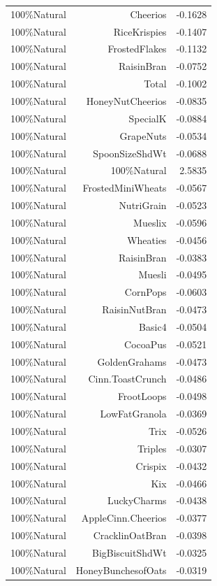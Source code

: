 \begin{longtable}{@{}lrr@{}}
100\%Natural & Cheerios & -0.1628 \\
100\%Natural & RiceKrispies & -0.1407 \\
100\%Natural & FrostedFlakes & -0.1132 \\
100\%Natural & RaisinBran & -0.0752 \\
100\%Natural & Total & -0.1002 \\
100\%Natural & HoneyNutCheerios & -0.0835 \\
100\%Natural & SpecialK & -0.0884 \\
100\%Natural & GrapeNuts & -0.0534 \\
100\%Natural & SpoonSizeShdWt & -0.0688 \\
100\%Natural & 100\%Natural & 2.5835 \\
100\%Natural & FrostedMiniWheats & -0.0567 \\
100\%Natural & NutriGrain & -0.0523 \\
100\%Natural & Mueslix & -0.0596 \\
100\%Natural & Wheaties & -0.0456 \\
100\%Natural & RaisinBran & -0.0383 \\
100\%Natural & Muesli & -0.0495 \\
100\%Natural & CornPops & -0.0603 \\
100\%Natural & RaisinNutBran & -0.0473 \\
100\%Natural & Basic4 & -0.0504 \\
100\%Natural & CocoaPus & -0.0521 \\
100\%Natural & GoldenGrahams & -0.0473 \\
100\%Natural & Cinn.ToastCrunch & -0.0486 \\
100\%Natural & FrootLoops & -0.0498 \\
100\%Natural & LowFatGranola & -0.0369 \\
100\%Natural & Trix & -0.0526 \\
100\%Natural & Triples & -0.0307 \\
100\%Natural & Crispix & -0.0432 \\
100\%Natural & Kix & -0.0466 \\
100\%Natural & LuckyCharms & -0.0438 \\
100\%Natural & AppleCinn.Cheerios & -0.0377 \\
100\%Natural & CracklinOatBran & -0.0398 \\
100\%Natural & BigBiscuitShdWt & -0.0325 \\
100\%Natural & HoneyBunchesofOats & -0.0319 \\

\end{longtable}
